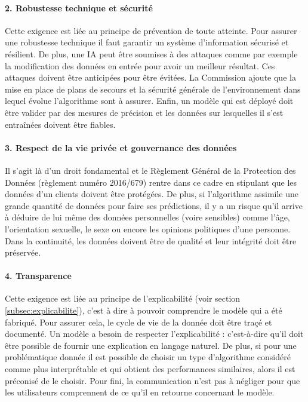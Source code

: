 \documentclass[10pt, french, a4paper]{report}
\begin{document}
\paragraph{2. Robustesse technique et sécurité} Cette exigence est liée au principe de prévention de toute atteinte. Pour assurer une robustesse technique il faut garantir un système d'information sécurisé et résilient. De plus, une IA peut être soumises à des attaques comme par exemple la modification des données en entrée pour avoir un meilleur résultat. Ces attaques doivent être anticipées pour être évitées. La Commission ajoute que la mise en place de plans de secours et la sécurité générale de l'environnement dans lequel évolue l'algorithme sont à assurer. Enfin, un modèle qui est déployé doit être valider par des mesures de précision et les données sur lesquelles il s'est entraînées doivent être fiables.

\paragraph{3. Respect de la vie privée et gouvernance des données} Il s'agit là d'un droit fondamental et le Règlement Général de la Protection des Données (règlement numéro 2016/679) rentre dans ce cadre en stipulant que les données d'un clients doivent être protégées. De plus, si l'algorithme assimile une grande quantité de données pour faire ses prédictions, il y a un risque qu'il arrive à déduire de lui même des données personnelles (voire sensibles) comme l'âge, l'orientation sexuelle, le sexe ou encore les opinions politiques d'une personne. Dans la continuité, les données doivent être de qualité et leur intégrité doit être préservée. 

\paragraph{4. Transparence} Cette exigence est liée au principe de l'explicabilité (voir section \ref{subsec:explicabilite}), c'est à dire à pouvoir comprendre le modèle qui a été fabriqué. Pour assurer cela, le cycle de vie de la donnée doit être traçé et documenté. Un modèle a besoin de respecter l'explicabilité : c'est-à-dire qu'il doit être possible de fournir une explication en langage naturel. De plus, si pour une problématique donnée il est possible de choisir un type d'algorithme considéré comme plus interprétable et qui obtient des performances similaires, alors il est préconisé de le choisir. Pour fini, la communication n'est pas à négliger pour que les utilisateurs comprennent de ce qu'il en retourne concernant le modèle. 
\end{document}
